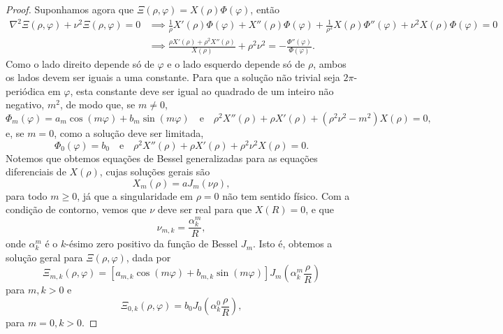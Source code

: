 \begin{proof}
    Suponhamos agora que \(\Xi(\rho, \varphi) = X(\rho)\Phi(\varphi)\), então
    \begin{align*}
        \nabla^2\Xi(\rho, \varphi) + \nu^2\Xi(\rho, \varphi) = 0 &\implies \frac{1}{\rho} X'(\rho) \Phi(\varphi) + X''(\rho)\Phi(\varphi) + \frac{1}{\rho^2} X(\rho)\Phi''(\varphi) + \nu^2 X(\rho)\Phi(\varphi) = 0\\
                                                                 &\implies \frac{\rho X'(\rho) + \rho^2 X''(\rho)}{X(\rho)} + \rho^2\nu^2 = - \frac{\Phi''(\varphi)}{\Phi(\varphi)}.
    \end{align*}
    Como o lado direito depende só de \(\varphi\) e o lado esquerdo depende só de \(\rho\), ambos os lados devem ser iguais a uma constante. Para que a solução não trivial seja \(2\pi\)-periódica em \(\varphi\), esta constante deve ser igual ao quadrado de um inteiro não negativo, \(m^2\), de modo que, se \(m \neq 0\),
    \begin{equation*}
        \Phi_m(\varphi) = a_m \cos(m \varphi) + b_m \sin(m \varphi)\quad\text{e}\quad\rho^2 X''(\rho) + \rho X'(\rho) + (\rho^2 \nu^2 - m^2)X(\rho) = 0,
    \end{equation*}
    e, se \(m = 0\), como a solução deve ser limitada,
    \begin{equation*}
        \Phi_0(\varphi) = b_0\quad\text{e}\quad \rho^2 X''(\rho) + \rho X'(\rho) + \rho^2 \nu^2X(\rho) = 0.
    \end{equation*}
    Notemos que obtemos equações de Bessel generalizadas para as equações diferenciais de \(X(\rho)\), cujas soluções gerais são
    \begin{equation*}
        X_m(\rho) = a J_m(\nu \rho),
    \end{equation*}
    para todo \(m \geq 0\), já que a singularidade em \(\rho = 0\) não tem sentido físico. Com a condição de contorno, vemos que \(\nu\) deve ser real para que \(X(R) = 0\), e que
    \begin{equation*}
        \nu_{m,k} = \frac{\alpha_k^m}{R},
    \end{equation*}
    onde \(\alpha_k^m\) é o \(k\)-ésimo zero positivo da função de Bessel \(J_m\). Isto é, obtemos a solução geral para \(\Xi(\rho, \varphi)\), dada por
    \begin{equation*}
        \Xi_{m,k}(\rho, \varphi) =  \left[a_{m,k}\cos(m\varphi) + b_{m,k}\sin(m\varphi)\right]J_m\left(\alpha_k^m \frac{\rho}{R}\right)
    \end{equation*}
    para \(m, k > 0\) e
    \begin{equation*}
       \Xi_{0,k}(\rho, \varphi) = b_0 J_0\left(\alpha_k^0\frac{\rho}{R}\right),
    \end{equation*}
    para \(m = 0, k > 0\).


\end{proof}
